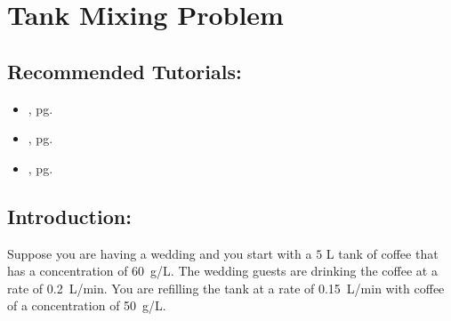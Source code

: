\section{Tank Mixing Problem}
\label{sec:tank_mixing_problem}	

\subsection*{Recommended Tutorials:}
\begin{itemize}[noitemsep]
    \item {}, pg. \pageref{chp:equation_solvers}
    \item {}, pg. \pageref{chp:limits}
	\item {}, pg. \pageref{chp:differential_equations}
\end{itemize}

\subsection*{Introduction:}
Suppose you are having a wedding and you start with a $5$ L tank of coffee that has a concentration of \SI{60}{\gram/\liter}. The wedding guests are drinking the coffee at a rate of \SI{0.2}{\liter/\minute}. You are refilling the tank at a rate of \SI{0.15}{\liter/\minute} with coffee of a concentration of \SI{50}{\gram/\liter}.

